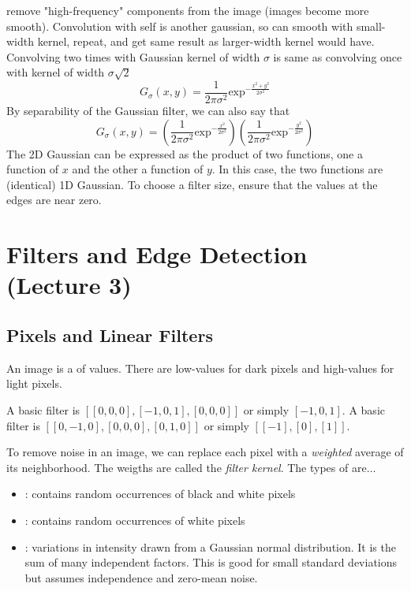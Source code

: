 \documentclass{article}
\begin{document}
\begin{definition}
   remove "high-frequency" components from the image (images become more smooth). Convolution with self is another gaussian, so can smooth with small-width kernel, repeat, and get same result as larger-width kernel would have. Convolving two times with Gaussian kernel of width $\sigma$ is same as convolving once with kernel of width $\sigma \sqrt{2}$ $$G_{\sigma}(x,y) = \frac{1}{2 \pi \sigma^{2}}\textrm{exp}^{- \frac{x^2 + y^2}{2 \sigma^2}}$$ By separability of the Gaussian filter, we can also say that $$G_{\sigma}(x,y) = (\frac{1}{2 \pi \sigma^{2}}\textrm{exp}^{- \frac{x^2}{2 \sigma^2}}) (\frac{1}{2 \pi \sigma^{2}}\textrm{exp}^{- \frac{y^2}{2 \sigma^2}})$$ The 2D Gaussian can be expressed as the product of two functions, one a function of $x$ and the other a function of $y$. In this case, the two functions are (identical) 1D Gaussian. To choose a filter size, ensure that the values at the edges are near zero. 
\end{definition}

\section{Filters and Edge Detection (Lecture 3)}

\subsection{Pixels and Linear Filters} 

An image is a  of values. There are low-values for dark pixels and high-values for light pixels. 

\begin{remark}
  A basic  filter is $[[0,0,0],[-1,0,1],[0,0,0]]$ or simply $[-1,0,1]$. A basic  filter is $[[0,-1,0],[0,0,0],[0,1,0]]$ or simply $[[-1],[0],[1]]$. 
\end{remark}

To remove noise in an image, we can replace each pixel with a \emph{weighted} average of its neighborhood. The weigths are called the \emph{filter kernel}. The types of  are$\dots$ 
\begin{itemize}
  \item {}: contains random occurrences of black and white pixels 
  \item {}: contains random occurrences of white pixels 
  \item {}: variations in intensity drawn from a Gaussian normal distribution. It is the sum of many independent factors. This is good for small standard deviations but assumes independence and zero-mean noise. 
\end{itemize}
\end{document}

